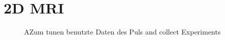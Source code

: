 \section{2D MRI}
\begin{figure}[H]
    \centering
    
    \caption{AZum tunen benutzte Daten des Puls and collect Experiments}
\end{figure}
